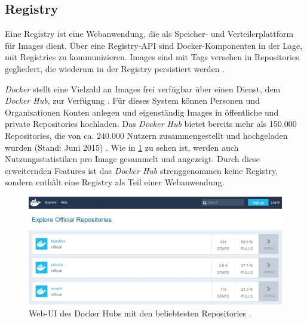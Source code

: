 \documentclass[../main.tex]{subfiles}
\begin{document}

		\subsection{Registry}
		\label{dockerRegistries}
      Eine Registry ist eine Webanwendung, die als Speicher- und Verteilerplattform für Images dient. Über eine Registry-API sind Docker-Komponenten in der Lage, mit Registries zu kommunizieren. Images sind mit Tags versehen in Repositories gegliedert, die wiederum in der Registry persistiert werden \cite{dockerRegistry}. %

      \emph{Docker} stellt eine Vielzahl an Images frei verfügbar über einen Dienst, dem \emph{Docker Hub}, zur Verfügung \cite[S.11]{dockerBook}\cite[S.3]{dockerSec1}\cite{dockerRegistry}. Für dieses System können Personen und Organisationen Konten anlegen und eigenständig Images in öffentliche und private Repositories hochladen. Das \emph{Docker Hub} bietet bereits mehr als 150.000 Repositories, die von ca. 240.000 Nutzern zusammengestellt und hochgeladen wurden (Stand: Juni 2015) \cite[S.16]{slideshareDockercon15}. Wie in \fig \ref{fig:intro_registry} zu sehen ist, werden auch Nutzungsstatistiken pro Image gesammelt und angezeigt. Durch diese erweiternden Features ist das \emph{Docker Hub} strenggenommen keine Registry, sondern enthält eine Registry als Teil einer Webanwendung. %

      \begin{figure}[h]
          \centering
          \includegraphics[width=1.0\textwidth]{./images/intro_registry.jpg}
          \caption{Web-\acrshort{UI} des Docker Hubs mit den beliebtesten Repositories \cite{dockerHub}.}
          \label{fig:intro_registry}
      \end{figure}
\end{document}
